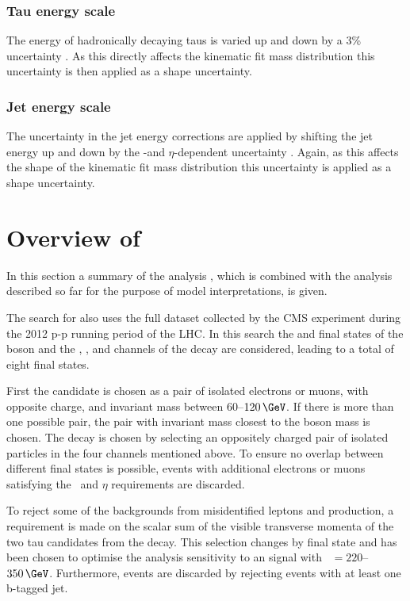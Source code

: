 \subsubsection*{Tau energy scale}
The energy of hadronically decaying taus is varied up and down by a 3\% uncertainty \cite{SMHtautauCMS}. As this directly affects the kinematic fit mass distribution this uncertainty is then applied as a shape uncertainty.
\subsubsection*{Jet energy scale}
The uncertainty in the jet energy corrections are applied by shifting the jet energy up and down by the \pT-and $\eta$-dependent uncertainty \cite{cms-jec-2011}. Again, as this affects the shape of the kinematic fit mass distribution this uncertainty is applied as a shape uncertainty.
\section{\texorpdfstring{Overview of \AtoZhtolltautau}{Overview of A->Zh->lltautau}}
\label{sec:hhh_azh}
In this section a summary of the \AtoZhtolltautau analysis \cite{CMS-HIG-14-034}, which is combined with the 
analysis described so far for the purpose of model interpretations, is given.

The search for \AtoZhtolltautau also uses the full dataset collected by the CMS experiment during
the 2012 p-p running period of the \ac{LHC}. In this search the \mumu and \ee final states of the \PZ boson
and the \emu, \etau, \mutau and \tautau channels of the \htotautau decay are considered, leading to a total of
eight final states. 

First the \PZ candidate is chosen as a pair of isolated electrons or muons, with opposite charge, and 
invariant mass between $60$--$120\,\GeV$. If there is more than one possible pair, the 
pair with invariant mass closest to the \PZ boson mass is chosen. The \htotautau decay is chosen by selecting
an oppositely charged pair of isolated particles in the four channels mentioned above. To ensure no overlap
between different final states is possible, events with additional electrons or muons satisfying the
\pT~and $\eta$ requirements are discarded.

To reject some of the backgrounds from misidentified leptons and \ZZ production, a requirement is made
on the scalar sum of the visible transverse momenta of the two tau candidates from the \htotautau decay.
This selection changes by final state and has been chosen to optimise the analysis sensitivity to an 
\AtoZh signal with \mA~$= 220$--$350\,\GeV$. Furthermore, \ttbar events are discarded by rejecting
events with at least one b-tagged jet. 

